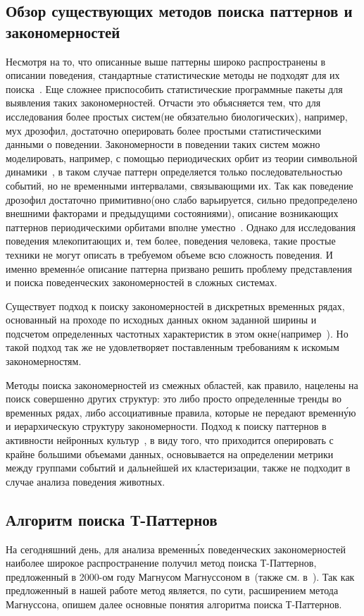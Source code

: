 \documentclass[12pt,fсeqn]{article}
\begin{document}
\subsection{ Обзор существующих методов поиска паттернов и закономерностей }
Несмотря на то, что описанные выше паттерны широко распространены в описании поведения,
стандартные статистические методы не подходят для их поиска~\cite{Magnusson}. Еще сложнее 
приспособить статистические программные пакеты для выявления таких закономерностей.
Отчасти это объясняется тем, что для исследования более простых систем(не обязательно биологических), например, мух дрозофил,
достаточно оперировать более простыми статистическими данными о поведении. Закономерности в поведении таких систем можно моделировать, например,
с помощью периодических орбит из теории символьной динамики~\cite{POrbits}, в таком случае паттерн определяется только последовательностью
событий, но не временными интервалами, связывающими их. Так как поведение дрозофил достаточно примитивно(оно слабо варьируется, сильно предопределено
внешними факторами и предыдущими состояниями), описание возникающих паттернов периодическими орбитами вполне уместно~\cite{Stoop}. 
Однако для исследования поведения млекопитающих и, тем более, поведения человека, такие простые техники не могут описать
в требуемом объеме всю сложность поведения. И именно временн\'oе описание паттерна призвано решить проблему представления
и поиска поведенческих закономерностей в сложных системах.

Существует подход к поиску закономерностей в дискретных временных рядах, основанный
на проходе по исходных данных окном заданной ширины и подсчетом определенных частотных
характеристик в этом окне(например~\cite{PPE}). Но такой подход так же не удовлетворяет
поставленным требованиям к искомым закономерностям.

Методы поиска закономерностей из смежных областей, 
как правило, нацелены на поиск совершенно других структур: это либо просто определенные тренды во временных рядах, 
либо ассоциативные правила, которые не передают временн\'{у}ю и иерархическую структуру закономерности. Подход 
к поиску паттернов в активности нейронных культур~\cite{NS_1, NS_2}, в виду того, что приходится оперировать с 
крайне большими объемами данных, основывается на определении метрики между группами событий
и дальнейшей их кластеризации, также не подходит в случае анализа поведения животных. 

\subsection{Алгоритм поиска Т-Паттернов}
На сегодняшний день, для анализа временн\'{ы}х поведенческих закономерностей
наиболее широкое распространение получил метод поиска Т-Паттернов, предложенный в 2000-ом году
Магнусом Магнуссоном в~\cite{Magnusson}(также см. в~\cite{coursework}). Так как предложенный в нашей работе метод
является, по сути, расширением метода Магнуссона, опишем далее основные понятия алгоритма поиска Т-Паттернов.
\end{document}
